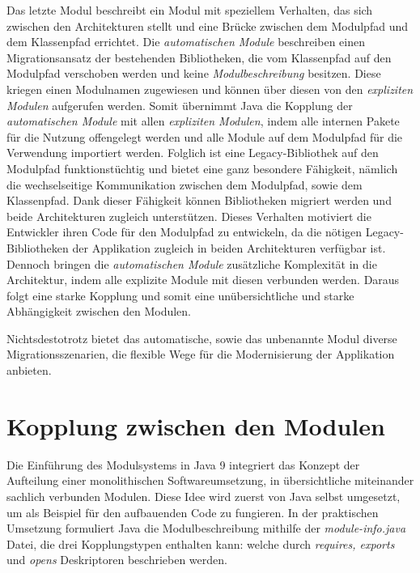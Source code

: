     Das letzte Modul beschreibt ein Modul mit speziellem Verhalten, das sich zwischen den Architekturen stellt und eine Brücke zwischen dem Modulpfad und dem Klassenpfad errichtet. Die \textit{automatischen Module} beschreiben einen Migrationsansatz der bestehenden Bibliotheken, die vom Klassenpfad auf den Modulpfad verschoben werden und keine \textit{Modulbeschreibung} besitzen. Diese kriegen einen Modulnamen zugewiesen und können über diesen von den \textit{expliziten Modulen} aufgerufen werden. Somit übernimmt Java die Kopplung der \textit{automatischen Module} mit allen \textit{expliziten Modulen}, indem alle internen Pakete für die Nutzung offengelegt werden und alle Module auf dem Modulpfad für die Verwendung importiert werden. Folglich ist eine Legacy-Bibliothek auf den Modulpfad funktionstüchtig und bietet eine ganz besondere Fähigkeit, nämlich die wechselseitige Kommunikation zwischen dem Modulpfad, sowie dem Klassenpfad. Dank dieser Fähigkeit können Bibliotheken migriert werden und beide Architekturen zugleich unterstützen. Dieses Verhalten motiviert die Entwickler ihren Code für den Modulpfad zu entwickeln, da die nötigen Legacy-Bibliotheken der Applikation zugleich in beiden Architekturen verfügbar ist.\newline
    Dennoch bringen die \textit{automatischen Module} zusätzliche Komplexität in die Architektur, indem alle explizite Module mit diesen verbunden werden. Daraus folgt eine starke Kopplung und somit eine unübersichtliche und starke Abhängigkeit zwischen den Modulen.\cite{modulMitJava9,java9modRevealed,modulProgJava9}\bigbreak

    Nichtsdestotrotz bietet das automatische, sowie das unbenannte Modul diverse Migrationsszenarien, die flexible Wege für die Modernisierung der Applikation anbieten.

  \section{Kopplung zwischen den Modulen} \label{sec:mod_kop}
    Die Einführung des Modulsystems in Java 9 integriert das Konzept der Aufteilung einer monolithischen Softwareumsetzung, in übersichtliche miteinander sachlich verbunden Modulen. Diese Idee wird zuerst von Java selbst umgesetzt, um als Beispiel für den aufbauenden Code zu fungieren. In der praktischen Umsetzung formuliert Java die Modulbeschreibung mithilfe der \textit{module-info.java} Datei, die drei Kopplungstypen enthalten kann: welche durch \textit{requires, exports} und \textit{opens} Deskriptoren beschrieben werden.

